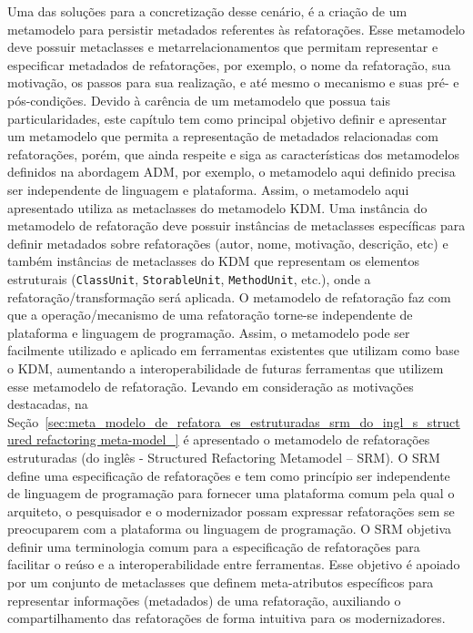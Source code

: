 Uma das soluções para a concretização desse cenário, é a criação de um metamodelo para persistir metadados referentes às refatorações. Esse metamodelo deve possuir metaclasses e metarrelacionamentos que permitam representar e especificar metadados de refatorações, por exemplo, o nome da refatoração, sua motivação, os passos para sua realização, e até mesmo o mecanismo e suas pré- e pós-condições. Devido à carência de um metamodelo que possua tais particularidades, este capítulo tem como principal objetivo definir e apresentar um metamodelo que permita a representação de metadados relacionadas com refatorações, porém, que ainda respeite e siga as características dos metamodelos definidos na abordagem ADM, por exemplo, o metamodelo aqui definido precisa ser independente de linguagem e plataforma. Assim, o metamodelo aqui apresentado utiliza as metaclasses do metamodelo KDM. Uma instância do metamodelo de refatoração deve possuir instâncias de metaclasses específicas para definir metadados sobre refatorações (autor, nome, motivação, descrição, etc) e também instâncias de metaclasses do KDM que representam os elementos estruturais (\texttt{ClassUnit}, \texttt{StorableUnit}, \texttt{MethodUnit}, etc.), onde a refatoração/transformação será aplicada. O metamodelo de refatoração faz com que a operação/mecanismo de uma refatoração torne-se independente de plataforma e linguagem de programação. Assim, o metamodelo pode ser facilmente utilizado e aplicado em ferramentas existentes que utilizam como base o KDM, aumentando a interoperabilidade de futuras ferramentas que utilizem esse metamodelo de refatoração. Levando em consideração as motivações destacadas, na Seção~\ref{sec:meta_modelo_de_refatora_es_estruturadas_srm_do_ingl_s_structured refactoring meta-model_} é apresentado o metamodelo de refatorações estruturadas (do inglês - Structured Refactoring Metamodel – SRM). O SRM define uma especificação de refatorações e tem como princípio ser independente de linguagem de programação para fornecer uma plataforma comum pela qual o arquiteto, o pesquisador e o modernizador possam expressar refatorações sem se preocuparem com a plataforma ou linguagem de programação. O SRM objetiva definir uma terminologia comum para a especificação de refatorações para facilitar o reúso e a interoperabilidade entre ferramentas. Esse objetivo é apoiado por um conjunto de metaclasses que definem meta-atributos específicos para representar informações (metadados) de uma refatoração, auxiliando o compartilhamento das refatorações de forma intuitiva para os modernizadores.
 


